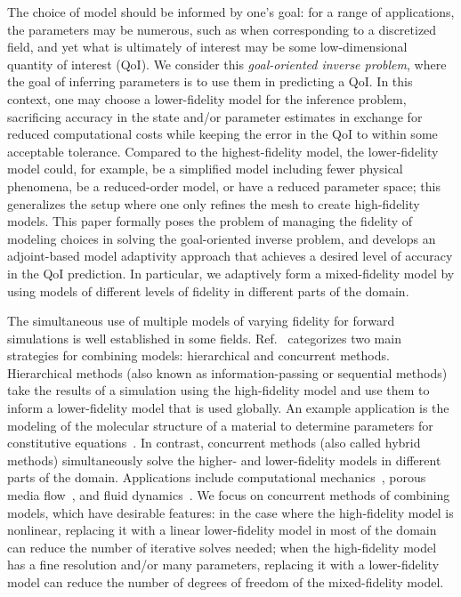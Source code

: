 \documentclass[review,sort&compress]{elsarticle}
\begin{document}
The choice of model should be informed by one's goal: for a range of applications, the parameters may be numerous, such as when corresponding to a discretized field, and yet what is ultimately of interest may be some low-dimensional quantity of interest (QoI). We consider this \textit{goal-oriented inverse problem}, where the goal of inferring parameters is to use them in predicting a QoI. In this context, one may choose a lower-fidelity model for the inference problem, sacrificing accuracy in the state and/or parameter estimates in exchange for reduced computational costs while keeping the error in the QoI to within some acceptable tolerance. Compared to the highest-fidelity model, the lower-fidelity model could, for example, be a simplified model including fewer physical phenomena, be a reduced-order model, or have a reduced parameter space; this generalizes the setup where one only refines the mesh to create high-fidelity models. This paper formally poses the problem of managing the fidelity of modeling choices in solving the goal-oriented inverse problem, and develops an adjoint-based model adaptivity approach that achieves a desired level of accuracy in the QoI prediction. In particular, we adaptively form a mixed-fidelity model by using models of different levels of fidelity in different parts of the domain.

The simultaneous use of multiple models of varying fidelity for forward simulations is well established in some fields. Ref.~\cite{Liuetal03} categorizes two main strategies for combining models: hierarchical and concurrent methods. Hierarchical methods (also known as information-passing or sequential methods) take the results of a simulation using the high-fidelity model and use them to inform a lower-fidelity model that is used globally. An example application is the modeling of the molecular structure of a material to determine parameters for constitutive equations~\cite{Haoetal03,Weietal04}. In contrast, concurrent methods (also called hybrid methods) simultaneously solve the higher- and lower-fidelity models in different parts of the domain. Applications include computational mechanics~\cite{Khareetal08,Prudetal08}, porous media flow~\cite{tartakovsky2008hybrid,battiato2011hybrid}, and fluid dynamics~\cite{AlexGarTar02,FatGerQua01,Garcetal99,LucKinBer02,vanOpstaletal15,WadErw90}. We focus on concurrent methods of combining models, which have desirable features: in the case where the high-fidelity model is nonlinear, replacing it with a linear lower-fidelity model in most of the domain can reduce the number of iterative solves needed; when the high-fidelity model has a fine resolution and/or many parameters, replacing it with a lower-fidelity model can reduce the number of degrees of freedom of the mixed-fidelity model.
\end{document}
